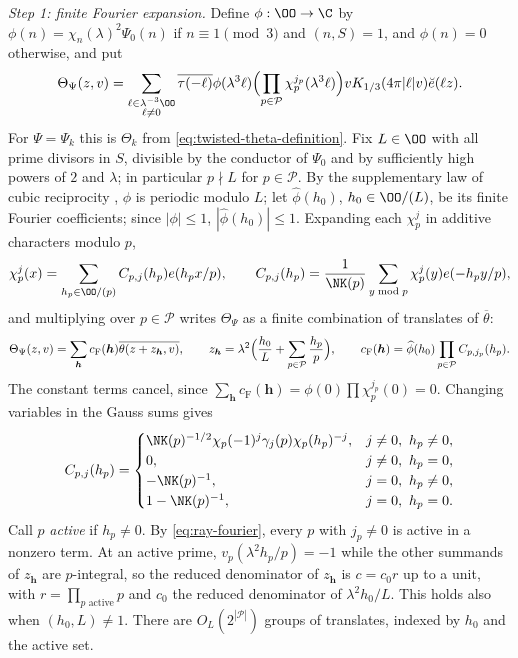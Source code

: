 \emph{Step 1: finite Fourier expansion.} Define $\phi:\OO\to\C$ by
$\phi(n)=\chi_n(\lambda)^2\Psi_0(n)$ if $n\equiv1\pmod3$ and $(n,S)=1$, and $\phi(n)=0$
otherwise, and put
\begin{equation}\label{eq:general-twisted-theta-definition}
 \Theta_\Psi(z,v)=
 \sum_{\substack{\ell\in\lambda^{-3}\OO\\\ell\ne0}}
 \overline{\tau(-\ell)}\phi(\lambda^3\ell)
 \Bigl(\prod_{p\in\mathcal P}\chi_p^{j_p}(\lambda^3\ell)\Bigr)
 vK_{1/3}(4\pi|\ell|v)\breve e(\ell z).
\end{equation}
For $\Psi=\Psi_k$ this is $\Theta_k$ from \eqref{eq:twisted-theta-definition}. Fix
$L\in\OO$ with all prime divisors in $S$, divisible by the conductor of $\Psi_0$ and by
sufficiently high powers of $2$ and $\lambda$; in particular $p\nmid L$ for $p\in\mathcal P$. By the supplementary law of cubic reciprocity
\cite[(1.5)]{DR}, $\phi$ is periodic modulo $L$; let $\widehat\phi(h_0)$, $h_0\in\OO/(L)$, be
its finite Fourier coefficients; since $|\phi|\le1$, $|\widehat\phi(h_0)|\le1$. Expanding each $\chi_p^{j}$ in additive characters modulo $p$,
\begin{equation}\label{eq:theta-local-fourier}
 \chi_p^j(x)=\sum_{h_p\in\OO/(p)}C_{p,j}(h_p)e(h_px/p),\qquad
 C_{p,j}(h_p)=\frac1{\NK(p)}\sum_{y\bmod p}\chi_p^j(y)e(-h_py/p),
\end{equation}
and multiplying over $p\in\mathcal P$ writes $\Theta_\Psi$ as a finite combination of
translates of $\overline\theta$:
\begin{equation}\label{eq:theta-factorized-shifts}
 \Theta_\Psi(z,v)=\sum_{\boldsymbol h}c_{\mathrm F}(\boldsymbol h)\overline{\theta(z+z_{\boldsymbol h},v)},\qquad
 z_{\boldsymbol h}=\lambda^2\Bigl(\frac{h_0}L+\sum_{p\in\mathcal P}\frac{h_p}p\Bigr),\qquad
 c_{\mathrm F}(\boldsymbol h)=\widehat\phi(h_0)\prod_{p\in\mathcal P}C_{p,j_p}(h_p).
\end{equation}
The constant terms cancel, since $\sum_{\boldsymbol h}c_{\mathrm F}(\boldsymbol h)=\phi(0)\prod\chi_p^{j_p}(0)=0$.
Changing variables in the Gauss sums gives
\begin{equation}\label{eq:ray-fourier}
C_{p,j}(h_p)=
 \begin{cases}
 \NK(p)^{-1/2}\chi_p(-1)^j\gamma_j(p)\chi_p(h_p)^{-j},
       &j\ne0,\ h_p\ne0,\\
 0,    &j\ne0,\ h_p=0,\\
 -\NK(p)^{-1},&j=0,\ h_p\ne0,\\
 1-\NK(p)^{-1},&j=0,\ h_p=0.
 \end{cases}
\end{equation}
Call $p$ \emph{active} if $h_p\ne0$. By \eqref{eq:ray-fourier}, every $p$ with $j_p\ne0$ is
active in a nonzero term. At an active prime, $v_p(\lambda^2h_p/p)=-1$ while the other summands of
$z_{\boldsymbol h}$ are $p$-integral, so the reduced denominator of $z_{\boldsymbol h}$ is
$c=c_0r$ up to a unit, with $r=\prod_{p\text{ active}}p$ and $c_0$ the reduced denominator of
$\lambda^2h_0/L$. This holds also when $(h_0,L)\ne1$. There are $O_L(2^{|\mathcal P|})$ groups
of translates, indexed by $h_0$ and the active set.

